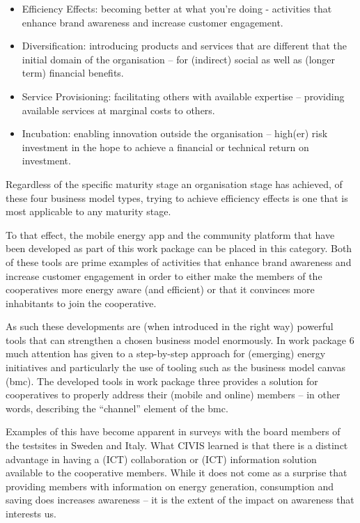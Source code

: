 \begin{itemize}
\item Efficiency Effects: becoming better at what you're doing - activities that enhance brand awareness and increase customer engagement.
\item Diversification: introducing products and services that are different that the initial domain of the organisation -- for (indirect) social as well as (longer term) financial benefits. 
\item Service Provisioning: facilitating others with available expertise -- providing available services at marginal costs to others.
\item Incubation: enabling innovation outside the organisation -- high(er) risk investment in the hope to achieve a financial or technical return on investment. 
\end{itemize}

Regardless of the specific maturity stage an organisation stage has achieved, of these four business model types, trying to achieve efficiency effects is one that is most applicable to any maturity stage. 

To that effect, the mobile energy app and the community platform that have been developed as part of this work package can be placed in this category. Both of these tools are prime examples of activities that enhance brand awareness and increase customer engagement in order to either make the members of the cooperatives more energy aware (and efficient) or that it convinces more inhabitants to join the cooperative.

As such these developments are (when introduced in the right way) powerful tools that can strengthen a chosen business model enormously. In work package 6 much attention has given to a step-by-step approach for (emerging) energy initiatives and particularly the use of tooling such as the business model canvas (bmc). The developed tools in work package three provides a solution for cooperatives to properly address their (mobile and online) members -- in other words, describing the ``channel'' element of the bmc.

Examples of this have become apparent in surveys with the board members of the testsites in Sweden and Italy. What CIVIS learned is that there is a distinct advantage in having a (ICT) collaboration or (ICT) information solution available to the cooperative members. While it does not come as a surprise that providing members with information on energy generation, consumption and saving does increases awareness -- it is the extent of the impact on awareness that interests us.

